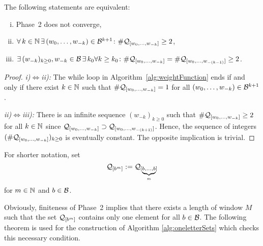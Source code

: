 \begin{lem}
\label{lem:equivalentStatementsForNonConvergenePhaseTwo}
The following statements are equivalent:
\begin{enumerate}[i)]
	\item Phase~2 does not converge,
	\item $\forall \,k\in \mathbb{N} \,\exists\, (w_{0}, \dots, w_{-k})\in\mathcal{B}^{k+1} \colon \#\mathcal{Q}_{[w_{0}, \dots, w_{-k}]}\geq 2$,
	\item $\exists \,(w_{-k})_{k\geq 0}, w_{-k}\in\mathcal{B} \,\exists\, k_0\forall k\geq k_0 \colon \#\mathcal{Q}_{[w_{0}, \dots, w_{-k}]}=\#\mathcal{Q}_{[w_{0}, \dots, w_{-(k-1)}]}\geq 2$.
\end{enumerate}
\end{lem}
\begin{proof}
\textit{i)}$\iff$\textit{ii):} The while loop in Algorithm~\ref{alg:weightFunction} ends if and only if there exist $k\in\mathbb{N}$ such that $\#\mathcal{Q}_{[w_{0}, \dots, w_{-k}]}=1$ for all $(w_{0}, \dots, w_{-k})\in\mathcal{B}^{k+1}$.

\textit{ii)}$\iff$\textit{iii):} There is an infinite sequence $(w_{-k})_{k\geq 0}$ such that $\#\mathcal{Q}_{[w_{0}, \dots, w_{-k}]}\geq 2$ for all $k\in\mathbb{N}$ since $\mathcal{Q}_{[w_{0}, \dots, w_{-k}]}\supset\mathcal{Q}_{[w_{0}, \dots, w_{-(k+1)}]}$. Hence, the sequence of integers $(\#\mathcal{Q}_{[w_{0}, \dots, w_{-k}]})_{k\geq 0}$ is eventually constant. The opposite implication is trivial.
\end{proof}

\begin{upravit}
For shorter notation, set 
$$
\mathcal{Q}_{[b^{m}]}:=\mathcal{Q}_{[\underbrace{\scriptstyle b,\dots,b}_m]}
$$ for $m \in \mathbb{N}$ and $b\in\mathcal{B}$.

Obviously, finiteness of Phase~2 implies that there exists a length of window $M$ such that the set $\mathcal{Q}_{[b^{m}]}$ contains only one element for all $b\in\mathcal{B}$. 
The following theorem is used for the construction of Algorithm \ref{alg:oneletterSets} which checks this necessary condition. 
\end{upravit}


